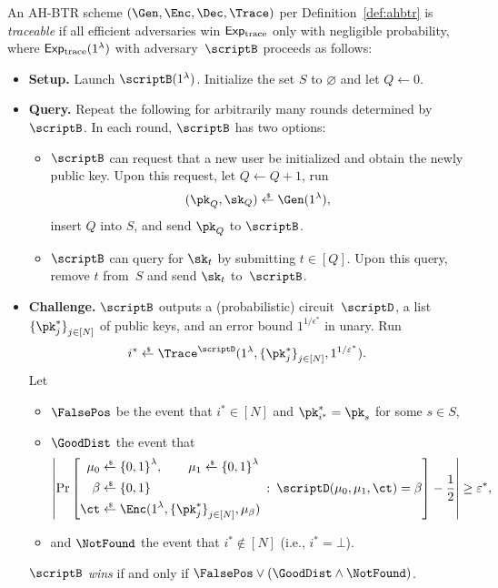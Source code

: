 \begin{definition}[traceability]\label{def:tracing-security}
An AH-BTR scheme $(\Gen,\Enc,\Dec,\Trace)$ per Definition~\ref{def:ahbtr} is \emph{traceable}
if all efficient adversaries win $\ExpTrace$ only with negligible probability,
where $\ExpTrace(1^\lambda)$ with adversary~$\scriptB$ proceeds as follows:
\begin{itemize}\upshape
\item\textbf{Setup.}
Launch $\scriptB(1^\lambda)$.
Initialize the set $S$ to $\varnothing$ and let ${Q\gets 0}$.
\item\textbf{Query.}
Repeat the following for arbitrarily many rounds determined by~$\scriptB$.
In each round, $\scriptB$ has two options:
\begin{itemize}
\item $\scriptB$ can request that a new user be initialized
and obtain the newly  public key.
Upon this request, let ${Q\gets Q+1}$, run
\begin{align*}
(\pk_Q,\sk_Q)\draws\Gen(1^\lambda),
\end{align*}
insert $Q$ into $S$, and send $\pk_Q$ to $\scriptB$.
\item $\scriptB$ can query for $\sk_t$ by submitting ${t\in[Q]}$.
Upon this query, remove $t$ from~$S$ and send $\sk_t$ to~$\scriptB$.
\end{itemize}
\item\textbf{Challenge.}
$\scriptB$ outputs a (probabilistic) circuit~$\scriptD$,
a list $\{\pk^\ast_j\}_{j\in[N]}^\sphantom$ of public keys, and
an error bound $1^{1/\epsilon^\ast}$ in unary.
Run
\begin{align*}
i^\ast\draws\Trace^\scriptD(1^\lambda,\{\pk^\ast_j\}_{j\in[N]}^\sphantom,1^{1/\epsilon^\ast}).
\end{align*}
Let
\begin{itemize}
\item $\FalsePos$ be the event that ${i^\ast\in[N]}$ and ${\pk^\ast_{i^\ast}=\pk_s^\sphantom}$ for some ${s\in S}$,
\item $\GoodDist$ the event that
\begin{align*}
\left|\Pr\left[
\begin{aligned}
\mu_0&{}\draws\bit^\lambda,\qquad
\mu_1\draws\bit^\lambda\\
\beta&{}\draws\bit\\
\ct&{}\draws\Enc(1^\lambda,\{\pk^\ast_j\}_{j\in[N]}^\sphantom,\mu_\beta)
\end{aligned}
\::\:
\scriptD(\mu_0,\mu_1,\ct)=\beta
\right]-\frac12
\right|
\geq\epsilon^\ast,
\end{align*}
\item and
$\NotFound$ the event that ${i^\ast\notin[N]}$ (i.e., ${i^\ast=\bot}$).
\end{itemize}
$\scriptB$ \emph{wins} if and only if ${\FalsePos\vee(\GoodDist\wedge\NotFound)}$.
\end{itemize}
\end{definition}

